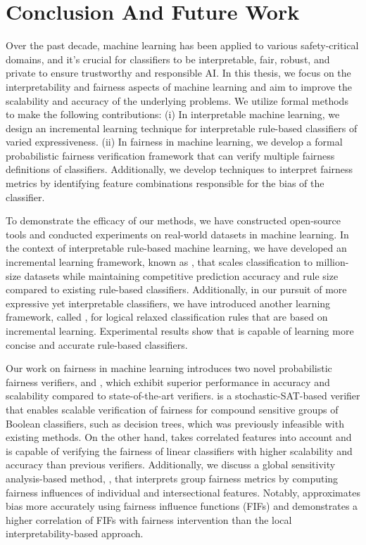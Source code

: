 \chapter{Conclusion And Future Work}
\label{chapter:conclusion} 
Over the past decade, machine learning has been applied to various safety-critical domains, and it's crucial for classifiers to be interpretable, fair, robust, and private to ensure trustworthy and responsible AI. In this thesis, we focus on the interpretability and fairness aspects of machine learning and aim to improve the scalability and accuracy of the underlying problems. We utilize formal methods to make the following contributions: (i) In interpretable machine learning, we design an incremental learning technique for interpretable rule-based classifiers of varied expressiveness. (ii) In fairness in machine learning, we develop a formal probabilistic fairness verification framework that can verify multiple fairness definitions of classifiers.  Additionally, we develop techniques to interpret fairness metrics by identifying feature combinations responsible for the bias of the classifier.



To demonstrate the efficacy of our methods, we have constructed open-source tools and conducted experiments on real-world datasets in machine learning. In the context of interpretable rule-based machine learning, we have developed an incremental learning framework, known as {\imli}, that scales classification to million-size datasets while maintaining competitive prediction accuracy and rule size compared to existing rule-based classifiers. Additionally, in our pursuit of more expressive yet interpretable classifiers, we have introduced another learning framework, called {\crr}, for logical relaxed classification rules that are based on incremental learning. Experimental results show that {\crr} is capable of learning more concise and accurate rule-based classifiers.


Our work on fairness in machine learning introduces two novel probabilistic fairness verifiers, {\justicia} and {\fvgm}, which exhibit superior performance in accuracy and scalability compared to state-of-the-art verifiers. {\justicia} is a stochastic-SAT-based verifier that enables scalable verification of fairness for compound sensitive groups of Boolean classifiers, such as decision trees, which was previously infeasible with existing methods. On the other hand, {\fvgm} takes correlated features into account and is capable of verifying the fairness of linear classifiers with higher scalability and accuracy than previous verifiers. Additionally, we discuss a global sensitivity analysis-based method, {\fairXplainer}, that interprets group fairness metrics by computing fairness influences of individual and intersectional features. Notably, {\fairXplainer} approximates bias more accurately using fairness influence functions (FIFs) and demonstrates a higher correlation of FIFs with fairness intervention than the local interpretability-based approach.








